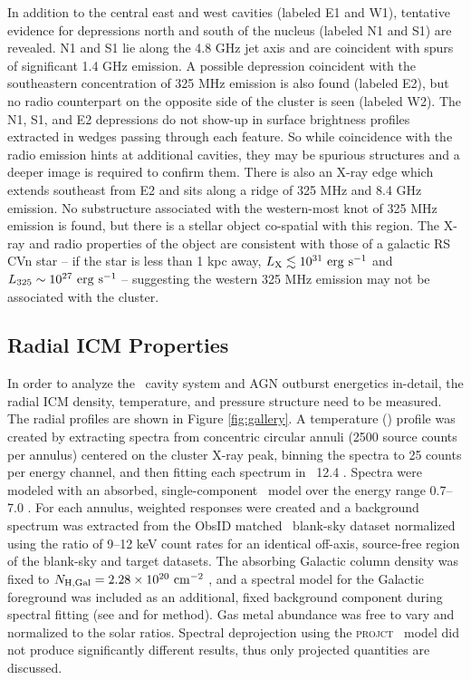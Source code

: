 \documentclass[apjpt4]{aastex}
\begin{document}
In addition to the central east and west cavities (labeled E1 and W1),
tentative evidence for depressions north and south of the nucleus
(labeled N1 and S1) are revealed. N1 and S1 lie along the 4.8 GHz jet
axis and are coincident with spurs of significant 1.4 GHz emission. A
possible depression coincident with the southeastern concentration of
325 MHz emission is also found (labeled E2), but no radio counterpart
on the opposite side of the cluster is seen (labeled W2). The N1, S1,
and E2 depressions do not show-up in surface brightness profiles
extracted in wedges passing through each feature. So while coincidence
with the radio emission hints at additional cavities, they may be
spurious structures and a deeper image is required to confirm
them. There is also an X-ray edge which extends southeast from E2 and
sits along a ridge of 325 MHz and 8.4 GHz emission. No substructure
associated with the western-most knot of 325 MHz emission is found,
but there is a stellar object co-spatial with this region. The X-ray
and radio properties of the object are consistent with those of a
galactic RS CVn star \citep{1993RPPh...56.1145S} -- if the star is
less than 1 kpc away, $L_{\rm{X}} \lesssim 10^{31} ~\rm{\mbox{\ensuremath{\rm{erg}}}~\ensuremath{\rm{\mbox{\ensuremath{\rm{s}}}^{-1}}}}$ and $L_{325} \sim
10^{27} ~\rm{\mbox{\ensuremath{\rm{erg}}}~\ensuremath{\rm{\mbox{\ensuremath{\rm{s}}}^{-1}}}}$ -- suggesting the western 325 MHz emission may not be
associated with the cluster.

\subsection{Radial ICM Properties}
\label{sec:icm}

In order to analyze the \rbs\ cavity system and AGN outburst
energetics in-detail, the radial ICM density, temperature, and
pressure structure need to be measured. The radial profiles are shown
in Figure \ref{fig:gallery}. A temperature (\tx) profile was created
by extracting spectra from concentric circular annuli (2500 source
counts per annulus) centered on the cluster X-ray peak, binning the
spectra to 25 counts per energy channel, and then fitting each
spectrum in \xspec\ 12.4 \citep{xspec}. Spectra were modeled with an
absorbed, single-component \mekal\ model \citep{mekal1} over the
energy range 0.7--7.0 \keV. For each annulus, weighted responses were
created and a background spectrum was extracted from the ObsID matched
\caldb\ blank-sky dataset normalized using the ratio of 9--12 keV
count rates for an identical off-axis, source-free region of the
blank-sky and target datasets. The absorbing Galactic column density
was fixed to $N_{\rm{H,Gal}} = 2.28 \times 10^{20} ~\mbox{\ensuremath{\rm{cm^{-2}}}}$ \citep{lab}, and a
spectral model for the Galactic foreground was included as an
additional, fixed background component during spectral fitting (see
\citealt{2005ApJ...628..655V} and \citealt{xrayband} for method). Gas
metal abundance was free to vary and normalized to the \citet{ag89}
solar ratios. Spectral deprojection using the {\textsc{projct}}
\xspec\ model did not produce significantly different results, thus
only projected quantities are discussed.
\end{document}
